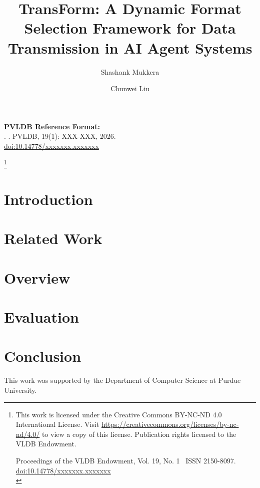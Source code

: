 \documentclass[sigconf, nonacm]{acmart}
\newcommand{\system}{TransForm}
\newcommand\vldbdoi{10.14778/xxxxxxx.xxxxxxx}
\newcommand\vldbpages{XXX-XXX}
\newcommand\vldbvolume{19}
\newcommand\vldbissue{1}
\newcommand\vldbyear{2026}
\newcommand\vldbauthors{\authors}
\newcommand\vldbtitle{\shorttitle}
\newcommand\vldbpagestyle{plain}
\begin{document}
\title{\system: A Dynamic Format Selection Framework for Data Transmission in AI Agent Systems}

\author{Shashank Mukkera}

\author{Chunwei Liu}

\begin{abstract}

\end{abstract}

\maketitle

\pagestyle{\vldbpagestyle}
\begingroup\small\noindent\raggedright\textbf{PVLDB Reference Format:}\\
\vldbauthors. \vldbtitle. PVLDB, \vldbvolume(\vldbissue): \vldbpages, \vldbyear.\\
\href{https://doi.org/\vldbdoi}{doi:\vldbdoi}
\endgroup

\begingroup
\renewcommand\thefootnote{}\footnote{\noindent
This work is licensed under the Creative Commons BY-NC-ND 4.0 International License. Visit \url{https://creativecommons.org/licenses/by-nc-nd/4.0/} to view a copy of this license. Publication rights licensed to the VLDB Endowment. \\
\raggedright Proceedings of the VLDB Endowment, Vol. \vldbvolume, No. \vldbissue\ %
ISSN 2150-8097. \\
\href{https://doi.org/\vldbdoi}{doi:\vldbdoi} \\
}\addtocounter{footnote}{-1}\endgroup

\section{Introduction}


\section{Related Work}


\section{Overview}


\section{Evaluation}


\section{Conclusion}


\begin{acks}
This work was supported by the Department of Computer Science at Purdue University.
\end{acks}



\end{document}
